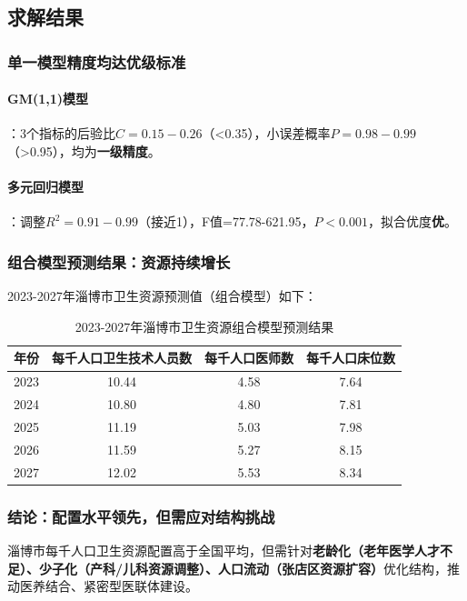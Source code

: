 \documentclass{MathNoteCN}
\begin{document}
\subsection{求解结果}
\subsubsection{单一模型精度均达优级标准}
\paragraph{GM(1,1)模型}：3个指标的后验比$C=0.15-0.26$（<0.35），小误差概率$P=0.98-0.99$（>0.95），均为\textbf{一级精度}\cite{wang2025}。

\paragraph{多元回归模型}：调整$R^2=0.91-0.99$（接近1），F值=77.78-621.95，$P<0.001$，拟合优度\textbf{优}\cite{wang2025}。

\subsubsection{组合模型预测结果：资源持续增长}
2023-2027年淄博市卫生资源预测值（组合模型）如下\cite{wang2025}：  

\begin{table}[h]
\centering
\caption{2023-2027年淄博市卫生资源组合模型预测结果}
\begin{tabular}{|c|c|c|c|}
\hline
年份 & 每千人口卫生技术人员数 & 每千人口医师数 & 每千人口床位数 \\
\hline
2023 & 10.44 & 4.58 & 7.64 \\
\hline
2024 & 10.80 & 4.80 & 7.81 \\
\hline
2025 & 11.19 & 5.03 & 7.98 \\
\hline
2026 & 11.59 & 5.27 & 8.15 \\
\hline
2027 & 12.02 & 5.53 & 8.34 \\
\hline
\end{tabular}
\end{table}

\subsubsection{结论：配置水平领先，但需应对结构挑战}
淄博市每千人口卫生资源配置高于全国平均，但需针对\textbf{老龄化（老年医学人才不足）、少子化（产科/儿科资源调整）、人口流动（张店区资源扩容）}优化结构，推动医养结合、紧密型医联体建设\cite{wang2025}。
\end{document}
